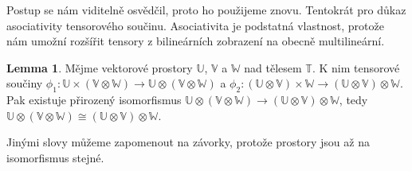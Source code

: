 \documentclass[a5paper,12pt]{amsbook}
\theoremstyle{definition}
\newtheorem{lemma}[theorem]{Lemma}
\newcommand{\myspace}[1]{\mathbb{#1}}
\begin{document}
\medskip\noindent
Postup se nám viditelně osvědčil, proto ho použijeme znovu. Tentokrát pro důkaz asociativity
tensorového součinu. Asociativita je podstatná vlastnost, protože nám umožní rozšířit tensory
z bilineárních zobrazení na obecně multilineární.

\begin{lemma}
Mějme vektorové prostory $\myspace{U}$, $\myspace{V}$ a $\myspace{W}$ nad tělesem $\myspace{T}$.
K nim tensorové součiny
$\phi_1: \myspace{U}\times(\myspace{V}\otimes\myspace{W})\rightarrow
  \myspace{U}\otimes(\myspace{V}\otimes\myspace{W})$
a $\phi_2: (\myspace{U}\otimes\myspace{V})\times\myspace{W}\rightarrow
  (\myspace{U}\otimes\myspace{V})\otimes\myspace{W}$. Pak existuje přirozený isomorfismus
$\myspace{U}\otimes(\myspace{V}\otimes\myspace{W})\rightarrow
  (\myspace{U}\otimes\myspace{V})\otimes\myspace{W}$,
tedy $\myspace{U}\otimes(\myspace{V}\otimes\myspace{W})\cong
  (\myspace{U}\otimes\myspace{V})\otimes\myspace{W}$.
\end{lemma}

Jinými slovy můžeme zapomenout na závorky, protože prostory jsou až na isomorfismus stejné.
\end{document}
